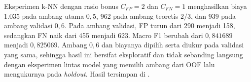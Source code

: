 Eksperimen k-NN dengan rasio bonus $C_{FP}=2$ dan $C_{FN}=1$ menghasilkan
biaya 1.035 pada ambang utama $0{,}5$, 962 pada ambang teoretis
$2/3$, dan 939 pada ambang validasi $0{,}6$. Pada ambang validasi,
FP turun dari 290 menjadi 158, sedangkan FN naik dari 455 menjadi 623.
Macro F1 berubah dari $0{,}841689$ menjadi $0{,}825069$. Ambang $0{,}6$
dan biayanya dipilih serta diukur pada validasi yang sama, sehingga hasil
ini bersifat eksploratif dan tidak sebanding langsung dengan eksperimen
lintas model yang memilih ambang dari OOF lalu mengukurnya pada
\textit{holdout}. Hasil tersimpan di
.
